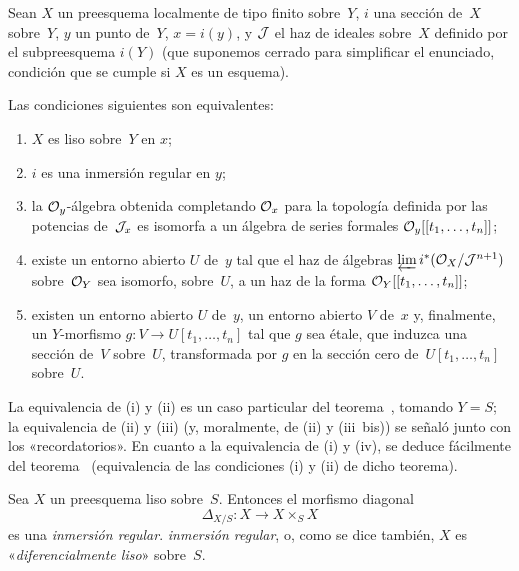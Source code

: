 \begin{corollaire}
\label{II.4.17}
Sean $X$ un preesquema localmente de tipo finito sobre~$Y$, $i$ una sección de~$X$ sobre~$Y$, $y$ un punto de~$Y$, $x=i(y)$, y $\cal{J}$ el haz de ideales sobre~$X$ definido por el subpreesquema $i(Y)$ (que suponemos cerrado para simplificar el enunciado, condición que se cumple si $X$ es un esquema).

Las condiciones siguientes son equivalentes:
\begin{enumerate}
\item[(i)] $X$ es liso sobre~$Y$ en $x$;
\item[(ii)] $i$ es una inmersión regular en $y$;
\item[(iii)] la $\cal{O}_y$-álgebra obtenida completando $\cal{O}_x$ para la topología definida por las potencias de~$\cal{J}_x$ es isomorfa a un álgebra de series formales $\cal{O}_y[[t_1,\dots,t_n]]$;
\item[(iii~bis)] existe un entorno abierto $U$ de~$y$ tal que el haz de álgebras $\varprojlim i^*(\cal{O}_X/\cal{J}^{n+1})$ sobre~$\cal{O}_Y$ sea isomorfo, sobre~$U$, a un haz de la forma $\cal{O}_Y[[t_1,\dots,t_n]]$;
\item[(iv)] existen un entorno abierto $U$ de~$y$, un entorno abierto $V$ de~$x$ y, finalmente, un $Y$-morfismo $g\colon V\to U[t_1,\dots,t_n]$ tal que $g$ sea étale, que
induzca una sección de~$V$ sobre~$U$, transformada por $g$ en la sección cero de~$U[t_1,\dots,t_n]$ sobre~$U$.
\end{enumerate}
\end{corollaire}

La equivalencia
de (i) y (ii) es un caso particular del teorema~, tomando $Y=S$; la equivalencia de (ii) y (iii) (y, moralmente, de (ii) y (iii~bis)) se señaló junto con los «recordatorios». En cuanto a la equivalencia de (i) y (iv), se deduce fácilmente del teorema~ (equivalencia de las condiciones (i) y (ii) de dicho teorema).

\begin{corollaire}
\label{II.4.18}
Sea $X$ un preesquema liso sobre~$S$. Entonces el morfismo diagonal
\[
\Delta_{X/S}\colon X\to X\times_S X
\]
es una
{\emph{inmersión regular}.}
{\emph{inmersión regular},}
o, como se dice también, $X$ es «\emph{diferencialmente liso}» sobre~$S$.
%
\end{corollaire}

